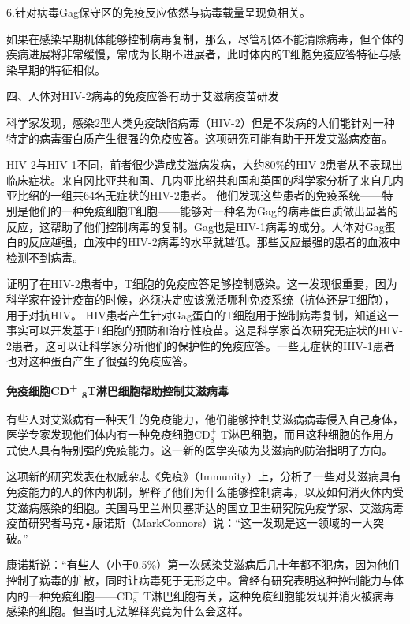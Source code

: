 6.针对病毒Gag保守区的免疫反应依然与病毒载量呈现负相关。

如果在感染早期机体能够控制病毒复制，那么，尽管机体不能清除病毒，但个体的疾病进展将非常缓慢，常成为长期不进展者，此时体内的T细胞免疫应答特征与感染早期的特征相似。

\begin{center}
 {\large 四、人体对HIV-2病毒的免疫应答有助于艾滋病疫苗研发}
 \end{center}

科学家发现，感染2型人类免疫缺陷病毒（HIV-2）但是不发病的人们能针对一种特定的病毒蛋白质产生很强的免疫应答。这项研究可能有助于开发艾滋病疫苗。

HIV-2与HIV-1不同，前者很少造成艾滋病发病，大约80\%的HIV-2患者从不表现出临床症状。来自冈比亚共和国、几内亚比绍共和国和英国的科学家分析了来自几内亚比绍的一组共64名无症状的HIV-2患者。
他们发现这些患者的免疫系统------特别是他们的一种免疫细胞T细胞------能够对一种名为Gag的病毒蛋白质做出显著的反应，这帮助了他们控制病毒的复制。Gag也是HIV-1病毒的成分。人体对Gag蛋白的反应越强，血液中的HIV-2病毒的水平就越低。那些反应最强的患者的血液中检测不到病毒。

证明了在HIV-2患者中，T细胞的免疫应答足够控制感染。这一发现很重要，因为科学家在设计疫苗的时候，必须决定应该激活哪种免疫系统（抗体还是T细胞），用于对抗HIV。
HIV患者产生针对Gag蛋白的T细胞用于控制病毒复制，知道这一事实可以开发基于T细胞的预防和治疗性疫苗。这是科学家首次研究无症状的HIV-2患者，这可以让科学家分析他们的保护性的免疫应答。一些无症状的HIV-1患者也对这种蛋白产生了很强的免疫应答。

\begin{center}
 \textbf{\Large 免疫细胞CD\textsuperscript{+} \textsubscript{8}T淋巴细胞帮助控制艾滋病毒}
 \end{center}


有些人对艾滋病有一种天生的免疫能力，他们能够控制艾滋病病毒侵入自己身体，医学专家发现他们体内有一种免疫细胞CD$_8^+$
T淋巴细胞，而且这种细胞的作用方式使人具有特别强的免疫能力。这一新的医学突破为艾滋病的防治指明了方向。

这项新的研究发表在权威杂志《免疫》（Immunity）上，分析了一些对艾滋病具有免疫能力的人的体内机制，解释了他们为什么能够控制病毒，以及如何消灭体内受艾滋病感染的细胞。美国马里兰州贝塞斯达的国立卫生研究院免疫学家、艾滋病毒疫苗研究者马克•康诺斯（MarkConnors）说：“这一发现是这一领域的一大突破。”

康诺斯说：“有些人（小于0.5\%）第一次感染艾滋病后几十年都不犯病，因为他们控制了病毒的扩散，同时让病毒死于无形之中。曾经有研究表明这种控制能力与体内的一种免疫细胞------CD$_8^+$
T淋巴细胞有关，这种免疫细胞能发现并消灭被病毒感染的细胞。但当时无法解释究竟为什么会这样。

